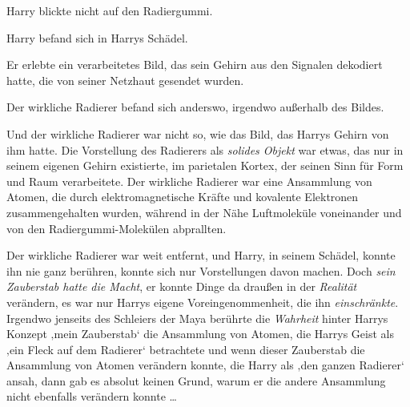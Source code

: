 Harry blickte nicht auf den Radiergummi.

Harry befand sich in Harrys Schädel.

Er erlebte ein verarbeitetes Bild, das sein Gehirn aus den Signalen dekodiert hatte, die von seiner Netzhaut gesendet wurden.

Der wirkliche Radierer befand sich anderswo, irgendwo außerhalb des Bildes.

Und der wirkliche Radierer war nicht so, wie das Bild, das Harrys Gehirn von ihm hatte. Die Vorstellung des Radierers als \emph{solides Objekt} war etwas, das nur in seinem eigenen Gehirn existierte, im parietalen Kortex, der seinen Sinn für Form und Raum verarbeitete. Der wirkliche Radierer war eine Ansammlung von Atomen, die durch elektromagnetische Kräfte und kovalente Elektronen zusammengehalten wurden, während in der Nähe Luftmoleküle voneinander und von den Radiergummi-Molekülen abprallten.

Der wirkliche Radierer war weit entfernt, und Harry, in seinem Schädel, konnte ihn nie ganz berühren, konnte sich nur Vorstellungen davon machen. Doch \emph{sein Zauberstab hatte die Macht}, er konnte Dinge da draußen in der \emph{Realität} verändern, es war nur Harrys eigene Voreingenommenheit, die ihn \emph{einschränkte}. Irgendwo jenseits des Schleiers der Maya berührte die \emph{Wahrheit} hinter Harrys Konzept ‚mein Zauberstab‘ die Ansammlung von Atomen, die Harrys Geist als ‚ein Fleck auf dem Radierer‘ betrachtete und wenn dieser Zauberstab die Ansammlung von Atomen verändern konnte, die Harry als ‚den ganzen Radierer‘ ansah, dann gab es absolut keinen Grund, warum er die andere Ansammlung nicht ebenfalls verändern konnte …

